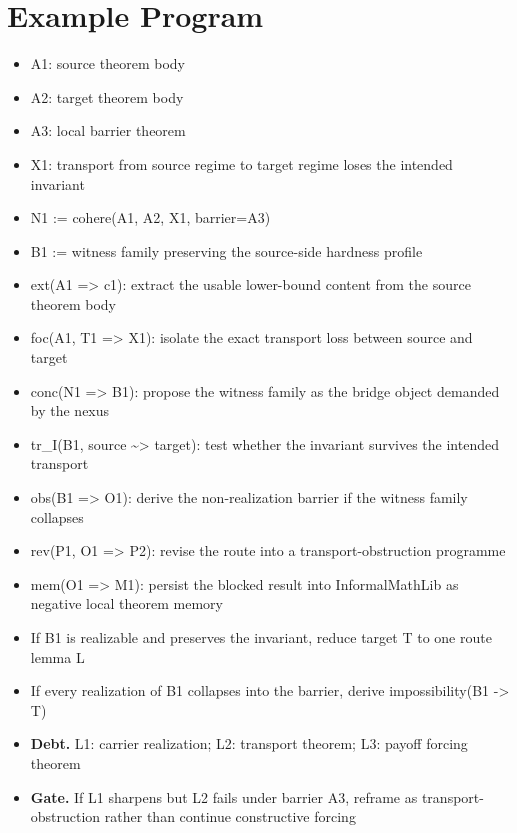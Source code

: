 \documentclass[11pt]{article}
\begin{document}
\section{Example Program}
\begin{itemize}[leftmargin=*,itemsep=0.25em]
\item A1: source theorem body
\item A2: target theorem body
\item A3: local barrier theorem
\item X1: transport from source regime to target regime loses the intended invariant
\item N1 := cohere(A1, A2, X1, barrier=A3)
\item B1 := witness family preserving the source-side hardness profile
\item ext(A1 => c1): extract the usable lower-bound content from the source theorem body
\item foc(A1, T1 => X1): isolate the exact transport loss between source and target
\item conc(N1 => B1): propose the witness family as the bridge object demanded by the nexus
\item tr\_I(B1, source \textasciitilde{}> target): test whether the invariant survives the intended transport
\item obs(B1 => O1): derive the non-realization barrier if the witness family collapses
\item rev(P1, O1 => P2): revise the route into a transport-obstruction programme
\item mem(O1 => M1): persist the blocked result into InformalMathLib as negative local theorem memory
\item If B1 is realizable and preserves the invariant, reduce target T to one route lemma L
\item If every realization of B1 collapses into the barrier, derive impossibility(B1 -> T)
\item \textbf{Debt.} L1: carrier realization; L2: transport theorem; L3: payoff forcing theorem
\item \textbf{Gate.} If L1 sharpens but L2 fails under barrier A3, reframe as transport-obstruction rather than continue constructive forcing
\end{itemize}
\end{document}
